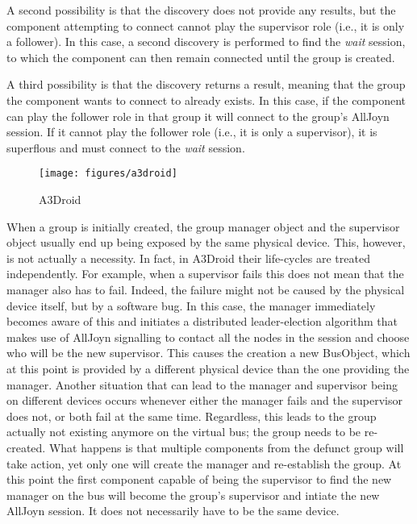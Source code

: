 A second possibility is that the discovery does not provide any results, but the component attempting to connect cannot play the supervisor role (i.e., it is only a follower). In this case, a second discovery is performed to find the \emph{wait} session, to which the component can then remain connected until the group is created. 

A third possibility is that the discovery returns a result, meaning that the group the component wants to connect to already exists. In this case, if the component can play the follower role in that group it will connect to the group's AllJoyn session. If it cannot play the follower role (i.e., it is only a supervisor), it is superflous and must connect to the \emph{wait} session. 

\begin{figure}[thb]
	\begin{center}
		\texttt{[image: figures/a3droid]}
	\end{center}
	\caption{A3Droid}
	\label{fig:a3droid}
\end{figure}

When a group is initially created, the group manager object and the supervisor object usually end up being exposed by the same physical device. This, however, is not actually a necessity. In fact, in A3Droid their life-cycles are treated independently. For example, when a supervisor fails this does not mean that the manager also has to fail. Indeed, the failure might not be caused by the physical device itself, but by a software bug. In this case, the manager immediately becomes aware of this and initiates a distributed leader-election algorithm that makes use of AllJoyn signalling to contact all the nodes in the session and choose who will be the new supervisor. This causes the creation a new BusObject, which at this point is provided by a different physical device than the one providing the manager. Another situation that can lead to the manager and supervisor being on different devices occurs whenever either the manager fails and the supervisor does not, or both fail at the same time. Regardless, this leads to the group actually not existing anymore on the virtual bus; the group needs to be re-created. What happens is that multiple components from the defunct group will take action, yet only one will create the manager and re-establish the group. At this point the first component capable of being the supervisor to find the new manager on the bus will become the group's supervisor and intiate the new AllJoyn session. It does not necessarily have to be the same device.

